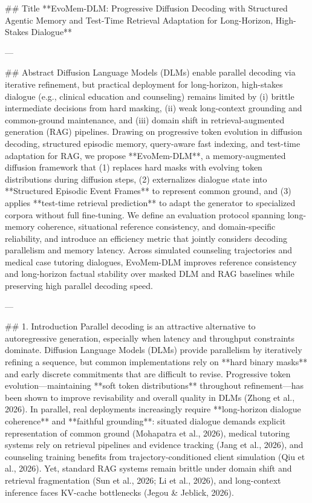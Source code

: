 ## Title  
**EvoMem-DLM: Progressive Diffusion Decoding with Structured Agentic Memory and Test-Time Retrieval Adaptation for Long-Horizon, High-Stakes Dialogue**

---

## Abstract  
Diffusion Language Models (DLMs) enable parallel decoding via iterative refinement, but practical deployment for long-horizon, high-stakes dialogue (e.g., clinical education and counseling) remains limited by (i) brittle intermediate decisions from hard masking, (ii) weak long-context grounding and common-ground maintenance, and (iii) domain shift in retrieval-augmented generation (RAG) pipelines. Drawing on progressive token evolution in diffusion decoding, structured episodic memory, query-aware fast indexing, and test-time adaptation for RAG, we propose **EvoMem-DLM**, a memory-augmented diffusion framework that (1) replaces hard masks with evolving token distributions during diffusion steps, (2) externalizes dialogue state into **Structured Episodic Event Frames** to represent common ground, and (3) applies **test-time retrieval prediction** to adapt the generator to specialized corpora without full fine-tuning. We define an evaluation protocol spanning long-memory coherence, situational reference consistency, and domain-specific reliability, and introduce an efficiency metric that jointly considers decoding parallelism and memory latency. Across simulated counseling trajectories and medical case tutoring dialogues, EvoMem-DLM improves reference consistency and long-horizon factual stability over masked DLM and RAG baselines while preserving high parallel decoding speed.  

---

## 1. Introduction  
Parallel decoding is an attractive alternative to autoregressive generation, especially when latency and throughput constraints dominate. Diffusion Language Models (DLMs) provide parallelism by iteratively refining a sequence, but common implementations rely on **hard binary masks** and early discrete commitments that are difficult to revise. Progressive token evolution—maintaining **soft token distributions** throughout refinement—has been shown to improve revisability and overall quality in DLMs (Zhong et al., 2026). In parallel, real deployments increasingly require **long-horizon dialogue coherence** and **faithful grounding**: situated dialogue demands explicit representation of common ground (Mohapatra et al., 2026), medical tutoring systems rely on retrieval pipelines and evidence tracking (Jang et al., 2026), and counseling training benefits from trajectory-conditioned client simulation (Qiu et al., 2026). Yet, standard RAG systems remain brittle under domain shift and retrieval fragmentation (Sun et al., 2026; Li et al., 2026), and long-context inference faces KV-cache bottlenecks (Jegou & Jeblick, 2026).

